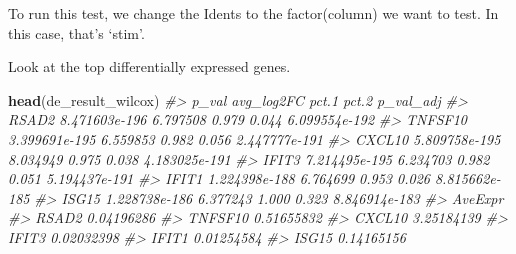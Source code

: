 \documentclass[
]{book}
\newenvironment{Shaded}{\begin{snugshade}}{\end{snugshade}}
\newcommand{\AttributeTok}[1]{\textcolor[rgb]{0.13,0.29,0.53}{#1}}
\newcommand{\CommentTok}[1]{\textcolor[rgb]{0.56,0.35,0.01}{\textit{#1}}}
\newcommand{\DecValTok}[1]{\textcolor[rgb]{0.00,0.00,0.81}{#1}}
\newcommand{\FunctionTok}[1]{\textcolor[rgb]{0.13,0.29,0.53}{\textbf{#1}}}
\newcommand{\NormalTok}[1]{#1}
\newcommand{\OtherTok}[1]{\textcolor[rgb]{0.56,0.35,0.01}{#1}}
\newcommand{\SpecialCharTok}[1]{\textcolor[rgb]{0.81,0.36,0.00}{\textbf{#1}}}
\newcommand{\StringTok}[1]{\textcolor[rgb]{0.31,0.60,0.02}{#1}}
\begin{document}
To run this test, we change the Idents to the factor(column) we want to test. In this case, that's `stim'.

\begin{Shaded}
\end{Shaded}

Look at the top differentially expressed genes.

\begin{Shaded}
\begin{Highlighting}[]
\FunctionTok{head}\NormalTok{(de\_result\_wilcox)}
\CommentTok{\#\textgreater{}                 p\_val avg\_log2FC pct.1 pct.2     p\_val\_adj}
\CommentTok{\#\textgreater{} RSAD2   8.471603e{-}196   6.797508 0.979 0.044 6.099554e{-}192}
\CommentTok{\#\textgreater{} TNFSF10 3.399691e{-}195   6.559853 0.982 0.056 2.447777e{-}191}
\CommentTok{\#\textgreater{} CXCL10  5.809758e{-}195   8.034949 0.975 0.038 4.183025e{-}191}
\CommentTok{\#\textgreater{} IFIT3   7.214495e{-}195   6.234703 0.982 0.051 5.194437e{-}191}
\CommentTok{\#\textgreater{} IFIT1   1.224398e{-}188   6.764699 0.953 0.026 8.815662e{-}185}
\CommentTok{\#\textgreater{} ISG15   1.228738e{-}186   6.377243 1.000 0.323 8.846914e{-}183}
\CommentTok{\#\textgreater{}            AveExpr}
\CommentTok{\#\textgreater{} RSAD2   0.04196286}
\CommentTok{\#\textgreater{} TNFSF10 0.51655832}
\CommentTok{\#\textgreater{} CXCL10  3.25184139}
\CommentTok{\#\textgreater{} IFIT3   0.02032398}
\CommentTok{\#\textgreater{} IFIT1   0.01254584}
\CommentTok{\#\textgreater{} ISG15   0.14165156}
\end{Highlighting}
\end{Shaded}
\end{document}
